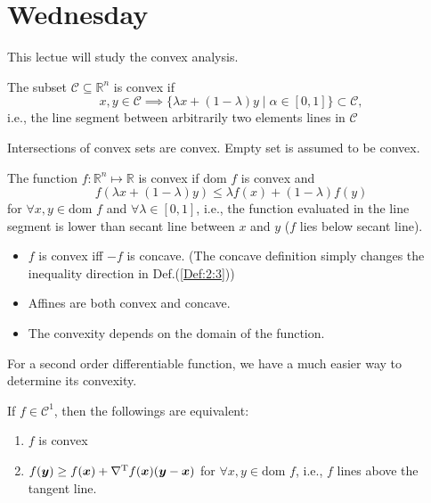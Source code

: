 

\section{Wednesday}
This lectue will study the convex analysis.

\begin{definition}[Convex]
The subset $\mathcal{C}\subseteq\mathbb{R}^n$ is convex if
\[
x,y\in\mathcal{C}\implies
\{\lambda x + (1-\lambda)y\mid \alpha\in[0,1]\}\subset\mathcal{C},
\]
i.e., the line segment between arbitrarily two elements lines in $\mathcal{C}$
\end{definition}
\begin{remark}
Intersections of convex sets are convex. Empty set is assumed to be convex.
\end{remark}
\begin{definition}[Convex]\label{Def:2:3}
The function $f:\mathbb{R}^n\mapsto\mathbb{R}$ is convex if $\mbox{dom }f$ is convex and
\[
f(\lambda x+ (1-\lambda)y)\le\lambda f(x) + (1-\lambda) f(y)
\]
for $\forall x,y\in\mbox{dom }f$ and $\forall \lambda\in[0,1]$, i.e., the function evaluated in the line segment is lower than secant line between $x$ and $y$ ($f$ lies below secant line).
\end{definition}
\begin{remark}
\begin{itemize}
\item
$f$ is convex iff $-f$ is concave. (The concave definition simply changes the inequality direction in Def.(\ref{Def:2:3}))
\item
Affines are both convex and concave.
\item
The convexity depends on the domain of the function.
\end{itemize}
\end{remark}
For a second order differentiable function, we have a much easier way to determine its convexity.
\begin{theorem}\label{The:2:1}
If $f\in\mathcal{C}^1$, then the followings are equivalent:
\begin{enumerate}
\item
$f$ is convex
\item
$f(\bm y)\ge f(\bm x)+\nabla^{\mathrm T} f(\bm x)(\bm y - \bm x)$ for $\forall x,y\in\mbox{dom }f$, i.e., $f$ lines above the tangent line.
\end{enumerate}
\end{theorem}
